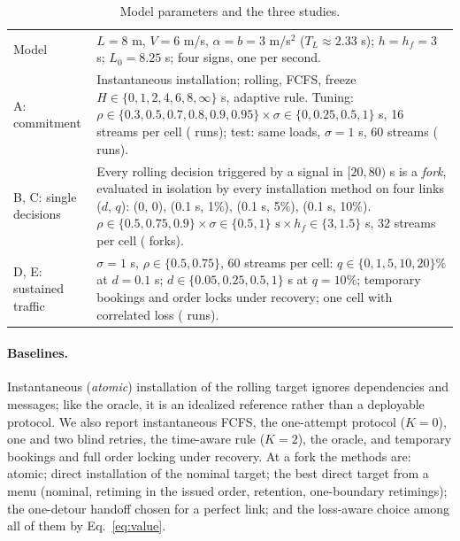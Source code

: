 \documentclass[10pt]{article}
\begin{document}
\begin{table}[t]\centering\small
\caption{Model parameters and the three studies.}\label{tab:design}
\begin{tabularx}{\linewidth}{@{}lX@{}}\toprule
Model & $L=8$ m, $V=6$ m/s, $\alpha=b=3$ m/s$^2$ ($T_L\approx2.33$ s); $h=h_f=3$ s; $L_0=8.25$ s; four signs, one per second. \\
A: commitment & Instantaneous installation; rolling, FCFS, freeze $H\in\{0,1,2,4,6,8,\infty\}$ s, adaptive rule. Tuning: $\rho\in\{0.3,0.5,0.7,0.8,0.9,0.95\}\times\sigma\in\{0,0.25,0.5,1\}$ s, 16 streams per cell (\nCommitTuneRuns{} runs); test: same loads, $\sigma=1$ s, 60 streams (\nCommitTestRuns{} runs). \\
B, C: single decisions & Every rolling decision triggered by a signal in $[20,80)$ s is a \emph{fork}, evaluated in isolation by every installation method on four links ($d$, $q$): (0, 0), (0.1 s, 1\%), (0.1 s, 5\%), (0.1 s, 10\%). $\rho\in\{0.5,0.75,0.9\}\times\sigma\in\{0.5,1\}\text{ s}\times h_f\in\{3,1.5\}$ s, 32 streams per cell (\nSweepForks{} forks). \\
D, E: sustained traffic & $\sigma=1$ s, $\rho\in\{0.5,0.75\}$, 60 streams per cell: $q\in\{0,1,5,10,20\}\%$ at $d=0.1$ s; $d\in\{0.05,0.25,0.5,1\}$ s at $q=10\%$; temporary bookings and order locks under recovery; one cell with correlated loss (\nRtRuns{} runs). \\\bottomrule
\end{tabularx}\end{table}

\paragraph{Baselines.} Instantaneous (\emph{atomic}) installation of the rolling target ignores dependencies and messages; like the oracle, it is an idealized reference rather than a deployable protocol. We also report instantaneous FCFS, the one-attempt protocol ($K=0$), one and two blind retries, the time-aware rule ($K=2$), the oracle, and temporary bookings and full order locking under recovery. At a fork the methods are: atomic; direct installation of the nominal target; the best direct target from a menu (nominal, retiming in the issued order, retention, one-boundary retimings); the one-detour handoff chosen for a perfect link; and the loss-aware choice among all of them by Eq.~\eqref{eq:value}.
\end{document}
